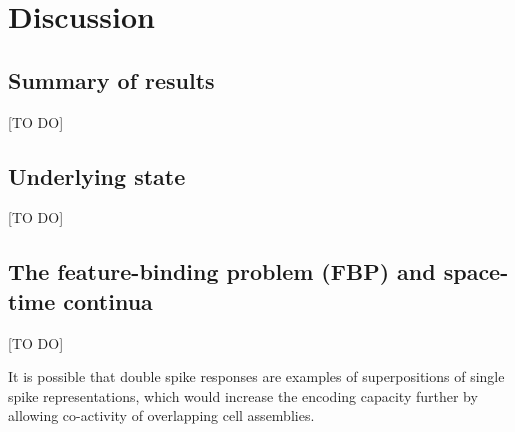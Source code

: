 \documentclass{article}
\begin{document}





\section{Discussion}

\subsection*{Summary of results}
[TO DO]

\subsection*{Underlying state}
[TO DO]


\subsection*{The feature-binding problem (FBP) and space-time continua}
[TO DO]

It is possible that double spike responses are examples of superpositions of single spike representations, which would increase the encoding capacity further by allowing co-activity of overlapping cell assemblies. 
\end{document}
